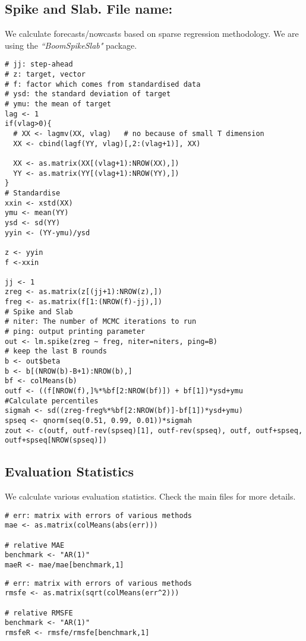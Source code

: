 \documentclass[12pt]{article}
\begin{document}
\subsection{Spike and Slab. File name: \color{blue}{sparse.R}}

We calculate forecasts/nowcasts based on sparse regression methodology. We are
using the \emph{``BoomSpikeSlab"} package.

\begin{lstlisting}[title=\textbf{Spike and Slab Regression.}]
# jj: step-ahead
# z: target, vector
# f: factor which comes from standardised data
# ysd: the standard deviation of target
# ymu: the mean of target
lag <- 1
if(vlag>0){
  # XX <- lagmv(XX, vlag)   # no because of small T dimension
  XX <- cbind(lagf(YY, vlag)[,2:(vlag+1)], XX)

  XX <- as.matrix(XX[(vlag+1):NROW(XX),])
  YY <- as.matrix(YY[(vlag+1):NROW(YY),])
}
# Standardise
xxin <- xstd(XX)
ymu <- mean(YY)
ysd <- sd(YY)
yyin <- (YY-ymu)/ysd

z <- yyin
f <-xxin

jj <- 1
zreg <- as.matrix(z[(jj+1):NROW(z),])
freg <- as.matrix(f[1:(NROW(f)-jj),])
# Spike and Slab
# niter: The number of MCMC iterations to run
# ping: output printing parameter
out <- lm.spike(zreg ~ freg, niter=niters, ping=B)
# keep the last B rounds
b <- out$beta
b <- b[(NROW(b)-B+1):NROW(b),]
bf <- colMeans(b)
outf <- ((f[NROW(f),]%*%bf[2:NROW(bf)]) + bf[1])*ysd+ymu
#Calculate percentiles
sigmah <- sd((zreg-freg%*%bf[2:NROW(bf)]-bf[1])*ysd+ymu)
spseq <- qnorm(seq(0.51, 0.99, 0.01))*sigmah
zout <- c(outf, outf-rev(spseq)[1], outf-rev(spseq), outf, outf+spseq, outf+spseq[NROW(spseq)])
\end{lstlisting}

\subsection{Evaluation Statistics}

We calculate various evaluation statistics. Check the main files for more
details.

\begin{lstlisting}[title=\textbf{Mean Absolute Error.}]
# err: matrix with errors of various methods
mae <- as.matrix(colMeans(abs(err)))

# relative MAE
benchmark <- "AR(1)"
maeR <- mae/mae[benchmark,1]
\end{lstlisting}

\begin{lstlisting}[title=\textbf{Root Mean Squared Forecast Error.}]
# err: matrix with errors of various methods
rmsfe <- as.matrix(sqrt(colMeans(err^2)))

# relative RMSFE
benchmark <- "AR(1)"
rmsfeR <- rmsfe/rmsfe[benchmark,1]
\end{lstlisting}
\end{document}
